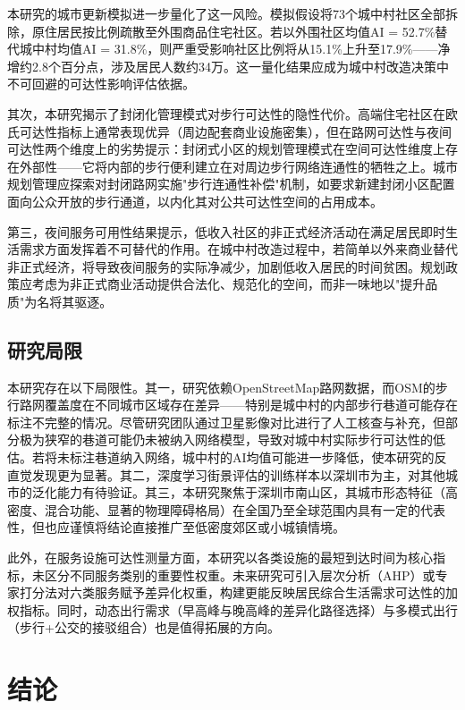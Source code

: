 \documentclass[10pt,conference]{IEEEtran}
\begin{document}
本研究的城市更新模拟进一步量化了这一风险。模拟假设将73个城中村社区全部拆除，原住居民按比例疏散至外围商品住宅社区。若以外围社区均值AI = 52.7\%替代城中村均值AI = 31.8\%，则严重受影响社区比例将从15.1\%上升至17.9\%——净增约2.8个百分点，涉及居民人数约34万。这一量化结果应成为城中村改造决策中不可回避的可达性影响评估依据。

其次，本研究揭示了封闭化管理模式对步行可达性的隐性代价。高端住宅社区在欧氏可达性指标上通常表现优异（周边配套商业设施密集），但在路网可达性与夜间可达性两个维度上的劣势提示：封闭式小区的规划管理模式在空间可达性维度上存在外部性——它将内部的步行便利建立在对周边步行网络连通性的牺牲之上。城市规划管理应探索对封闭路网实施"步行连通性补偿"机制，如要求新建封闭小区配置面向公众开放的步行通道，以内化其对公共可达性空间的占用成本。

第三，夜间服务可用性结果提示，低收入社区的非正式经济活动在满足居民即时生活需求方面发挥着不可替代的作用。在城中村改造过程中，若简单以外来商业替代非正式经济，将导致夜间服务的实际净减少，加剧低收入居民的时间贫困。规划政策应考虑为非正式商业活动提供合法化、规范化的空间，而非一味地以"提升品质"为名将其驱逐。

\subsection{研究局限}

本研究存在以下局限性。其一，研究依赖OpenStreetMap路网数据，而OSM的步行路网覆盖度在不同城市区域存在差异——特别是城中村的内部步行巷道可能存在标注不完整的情况。尽管研究团队通过卫星影像对比进行了人工核查与补充，但部分极为狭窄的巷道可能仍未被纳入网络模型，导致对城中村实际步行可达性的低估。若将未标注巷道纳入网络，城中村的AI均值可能进一步降低，使本研究的反直觉发现更为显著。其二，深度学习街景评估的训练样本以深圳市为主，对其他城市的泛化能力有待验证。其三，本研究聚焦于深圳市南山区，其城市形态特征（高密度、混合功能、显著的物理障碍格局）在全国乃至全球范围内具有一定的代表性，但也应谨慎将结论直接推广至低密度郊区或小城镇情境。

此外，在服务设施可达性测量方面，本研究以各类设施的最短到达时间为核心指标，未区分不同服务类别的重要性权重。未来研究可引入层次分析（AHP）或专家打分法对六类服务赋予差异化权重，构建更能反映居民综合生活需求可达性的加权指标。同时，动态出行需求（早高峰与晚高峰的差异化路径选择）与多模式出行（步行+公交的接驳组合）也是值得拓展的方向。

\section{结论}
\label{sec:conclusion}
\end{document}
